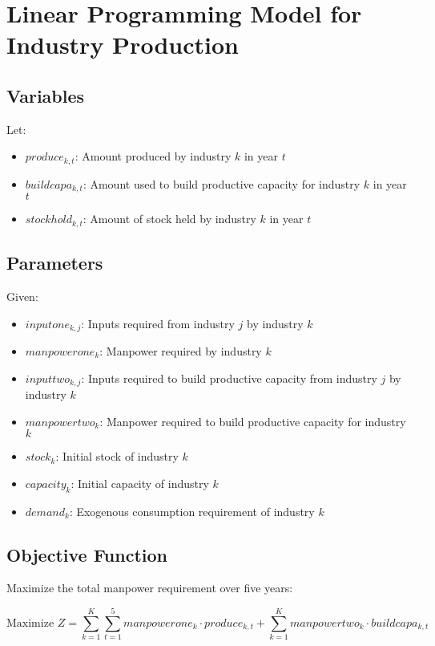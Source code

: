 \documentclass{article}
\begin{document}
\section*{Linear Programming Model for Industry Production}

\subsection*{Variables}
Let:
\begin{itemize}
    \item \( produce_{k,t} \): Amount produced by industry \( k \) in year \( t \)
    \item \( buildcapa_{k,t} \): Amount used to build productive capacity for industry \( k \) in year \( t \)
    \item \( stockhold_{k,t} \): Amount of stock held by industry \( k \) in year \( t \)
\end{itemize}

\subsection*{Parameters}
Given:
\begin{itemize}
    \item \( inputone_{k,j} \): Inputs required from industry \( j \) by industry \( k \)
    \item \( manpowerone_k \): Manpower required by industry \( k \)
    \item \( inputtwo_{k,j} \): Inputs required to build productive capacity from industry \( j \) by industry \( k \)
    \item \( manpowertwo_k \): Manpower required to build productive capacity for industry \( k \)
    \item \( stock_k \): Initial stock of industry \( k \) 
    \item \( capacity_k \): Initial capacity of industry \( k \)
    \item \( demand_k \): Exogenous consumption requirement of industry \( k \)
\end{itemize}

\subsection*{Objective Function}
Maximize the total manpower requirement over five years:

\[
\text{Maximize } Z = \sum_{k=1}^{K} \sum_{t=1}^{5} manpowerone_k \cdot produce_{k,t} + \sum_{k=1}^{K} manpowertwo_k \cdot buildcapa_{k,t}
\]
\end{document}
